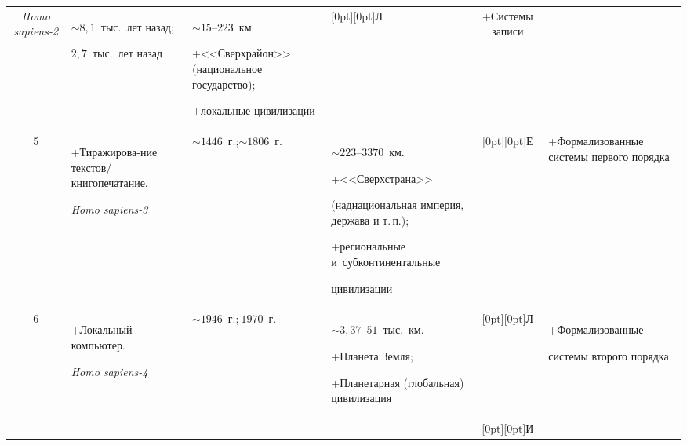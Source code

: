 \begin{enumerate}[1.]
\begin{table}
\begin{center}
\begin{tabular}{|c|p{22mm}|p{30mm}|p{35mm}|c|p{22mm}|}
\textit{Homo sapiens-2}&$\sim 8{,}1$~тыс.\ лет назад;\newline


 $2{,}7$~тыс.\ лет на\-зад&$\sim 15\mbox{--}223$~км.\newline 


+\;<<Сверх\-рай\-он>> (на\-ци\-о\-наль\-ное го\-су\-дар\-ст\-во); \newline


+\;ло\-каль\-ные ци\-ви\-ли\-за\-ции&{\raisebox{-37pt}[0pt][0pt]{Л}}&+\;Сис\-те\-мы за\-пи\-си\\


\cline{1-4}


\cline{6-6}


5&+\;Ти\-ра\-жи\-ро\-ва-\newline ние текс\-тов/\newline кни\-го\-пе\-ча\-та\-ние.\newline 


 \textit{Homo sapiens-3}&$\sim 1446$~г.;\newline $\sim 1806$~г.&$\sim 223\mbox{--}3370$~км.\newline


  +\;<<Сверх\-стра\-на>> 


 (над\-на\-ци\-о\-наль\-ная им\-пе\-рия, дер\-жа\-ва и т.\,п.);\newline


 +\;ре\-гио\-наль\-ные и~суб\-кон\-ти\-нен\-таль\-ные 


ци\-ви\-ли\-за\-ции &{\raisebox{-35pt}[0pt][0pt]{Е}}&+\;Фор\-ма\-ли\-зо\-ван\-ные сис\-те\-мы пер\-во\-го по\-ряд\-ка\\


\cline{1-4}


\cline{6-6}


6&+\;Ло\-каль\-ный компь\-ютер.\newline 


 \textit{Homo sapiens-4 }&$\sim 1946$~г.;\newline $~1970$~г.&$\sim 3{,}37\mbox{--}51$~тыс.\ км.\newline


  +\;Пла\-не\-та  Зем\-ля;\newline


 +\;Пла\-не\-тар\-ная (гло\-баль\-ная) ци\-ви\-ли\-за\-ция&{\raisebox{-7pt}[0pt][0pt]{Л}}&+\;Фор\-ма\-ли\-зо\-ван\-ные 


сис\-те\-мы вто\-ро\-го по\-ряд\-ка\\


&&&&{\raisebox{-8pt}[0pt][0pt]{И}}&\\



\end{tabular}
\end{center}
\end{table}
\end{enumerate}
